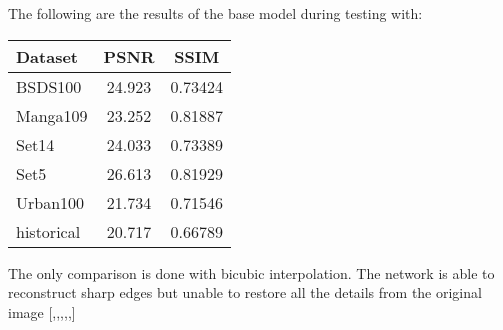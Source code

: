 The following are the results of the base model during testing with:

\begin{tabular}{l|cc}
    Dataset & PSNR & SSIM \\
    \hline
    BSDS100 & 24.923 & 0.73424 \\
    Manga109 & 23.252 & 0.81887 \\
    Set14 & 24.033 & 0.73389 \\
    Set5 & 26.613 & 0.81929\\
    Urban100 & 21.734 & 0.71546 \\
    historical\footnotemark & 20.717 & 0.66789
\end{tabular}

The only comparison is done with bicubic interpolation. 
The network is able to reconstruct sharp edges but unable to restore all the details from the original image [,,,,,]


